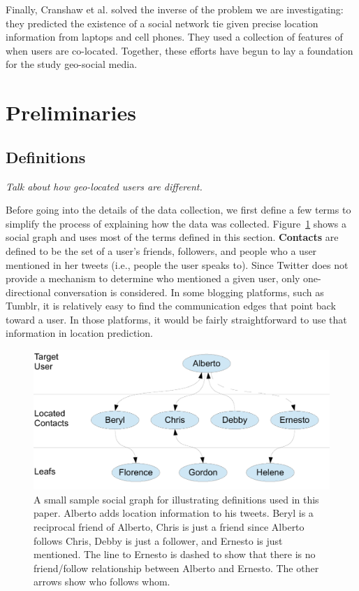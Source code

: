\documentclass[letterpaper]{article}
\newcommand{\jam}[1]{\emph{#1}}
\newcommand{\flchap}[1]{\section{#1}}
\newcommand{\flsec}[1]{\subsection{#1}}
\begin{document}

Finally, Cranshaw et al. \cite{cranshaw2010bridging} solved the inverse of the
problem we are investigating: they predicted the existence of a social network
tie given precise location information from laptops and cell phones. They used
a collection of features of when users are co-located.  Together, these efforts
have begun to lay a foundation for the study geo-social media.

\flchap{Preliminaries}

\flsec{Definitions}

\jam{Talk about how geo-located users are different.}

Before going into the details of the data collection, we first define a few
terms to simplify the process of explaining how the data was collected.
%
\ifdefined\THESIS
    Figure~\ref{fig:Terms} shows a social graph and uses most of the terms
    defined in this section.
\fi
%
\textbf{Contacts} are defined to be the set of a user's friends, followers, and
people who a user mentioned in her tweets (i.e., people the user speaks to).
%
Since Twitter does not provide a mechanism to determine who mentioned a given
user, only one-directional conversation is considered.
%
In some blogging platforms, such as Tumblr, it is relatively easy to find the
communication edges that point back toward a user.
%
In those platforms, it would be fairly straightforward to use that information
in location prediction.

\ifdefined\THESIS
    \begin{figure}[tbh]
    \centering
    \includegraphics[width=\linewidth]{figures/terms.pdf}
    \caption{
    A small sample social graph for illustrating definitions used in this paper.
    Alberto adds location information to his tweets.
    Beryl is a reciprocal friend of Alberto, Chris is just a friend since Alberto
    follows Chris, Debby is just a follower, and Ernesto is just mentioned.
    The line to Ernesto is dashed to show that there is no friend/follow
    relationship between Alberto and Ernesto.
    The other arrows show who follows whom.
    }
    \label{fig:Terms}
    \end{figure}
\fi
\end{document}
